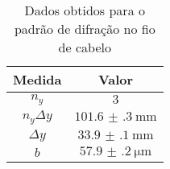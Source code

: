 \begin{table}[H]
	\centering
	\begin{tabular}{cc}
		\toprule\toprule
            {\bfseries Medida} & {\bfseries Valor}
        \\\midrule
        $n_y$           & $3$ \\
        $n_y \Delta y$  & $\SI{101.6(3)}{\milli\meter}$ \\
        $\Delta y$      & $\SI{33.9(1)}{\milli\meter}$ \\
        $b$             & $\SI{57.9(2)}{\micro\meter}$
        \\\bottomrule\bottomrule
	\end{tabular}

	\caption{Dados obtidos para o padrão de difração no fio de cabelo}
	\label{tab:difcab}
\end{table}